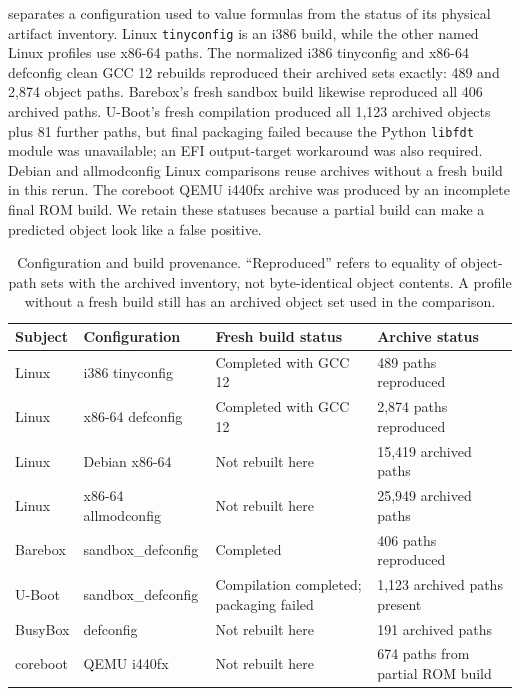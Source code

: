 \documentclass[acmsmall,screen,review]{acmart}
\begin{document}
 separates a configuration used to value formulas from the status of its physical artifact inventory. Linux \texttt{tinyconfig} is an i386 build, while the other named Linux profiles use x86-64 paths. The normalized i386 tinyconfig and x86-64 defconfig clean GCC 12 rebuilds reproduced their archived sets exactly: 489 and 2,874 object paths. Barebox's fresh sandbox build likewise reproduced all 406 archived paths. U-Boot's fresh compilation produced all 1,123 archived objects plus 81 further paths, but final packaging failed because the Python \texttt{libfdt} module was unavailable; an EFI output-target workaround was also required. Debian and allmodconfig Linux comparisons reuse archives without a fresh build in this rerun. The coreboot QEMU i440fx archive was produced by an incomplete final ROM build. We retain these statuses because a partial build can make a predicted object look like a false positive.

\begin{table}[t]
\centering\footnotesize
\caption{Configuration and build provenance. ``Reproduced'' refers to equality of object-path sets with the archived inventory, not byte-identical object contents. A profile without a fresh build still has an archived object set used in the comparison.}
\label{tab:profiles}
\setlength{\tabcolsep}{3pt}
\begin{tabular}{p{22mm}p{33mm}p{36mm}p{35mm}}
\toprule
Subject & Configuration & Fresh build status & Archive status \\
\midrule
Linux & i386 tinyconfig & Completed with GCC 12 & 489 paths reproduced \\
Linux & x86-64 defconfig & Completed with GCC 12 & 2,874 paths reproduced \\
Linux & Debian x86-64 & Not rebuilt here & 15,419 archived paths \\
Linux & x86-64 allmodconfig & Not rebuilt here & 25,949 archived paths \\
Barebox & sandbox\_defconfig & Completed & 406 paths reproduced \\
U-Boot & sandbox\_defconfig & Compilation completed; packaging failed & 1,123 archived paths present \\
BusyBox & defconfig & Not rebuilt here & 191 archived paths \\
coreboot & QEMU i440fx & Not rebuilt here & 674 paths from partial ROM build \\
\bottomrule
\end{tabular}
\end{table}
\end{document}
